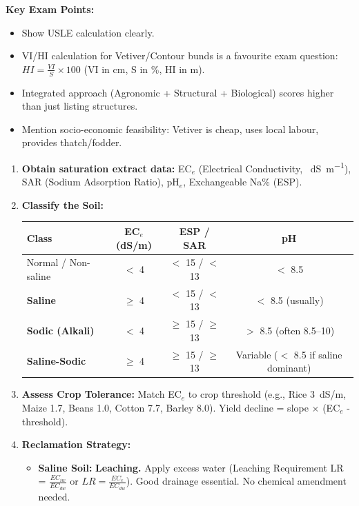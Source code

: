 \documentclass[11pt]{article}
\begin{document}
\begin{exoresolu}
\noindent\textbf{Key Exam Points:} 
\begin{itemize}
\item Show USLE calculation clearly.
\item VI/HI calculation for Vetiver/Contour bunds is a favourite exam question: $HI = \frac{VI}{S} \times 100$ (VI in cm, S in \%, HI in m).
\item Integrated approach (Agronomic + Structural + Biological) scores higher than just listing structures.
\item Mention socio-economic feasibility: Vetiver is cheap, uses local labour, provides thatch/fodder.
\end{itemize}
\end{exoresolu}

\begin{methode}
\begin{enumerate}
\item \textbf{Obtain saturation extract data:} EC$_e$ (Electrical Conductivity, \SI{}{dS.m^{-1}}), SAR (Sodium Adsorption Ratio), pH$_e$, Exchangeable Na\% (ESP).
\item \textbf{Classify the Soil:}
      \begin{center}
      \begin{tabular}{|l|c|c|c|}\hline
      \rowcolor{popblueL}
      \textbf{Class} & \textbf{EC$_e$ (dS/m)} & \textbf{ESP / SAR} & \textbf{pH} \\\hline
      Normal / Non-saline & $<$ 4 & $<$ 15 / $<$ 13 & $<$ 8.5 \\\hline
      \textbf{Saline} & $\ge$ 4 & $<$ 15 / $<$ 13 & $<$ 8.5 (usually) \\\hline
      \textbf{Sodic (Alkali)} & $<$ 4 & $\ge$ 15 / $\ge$ 13 & $>$ 8.5 (often 8.5--10) \\\hline
      \textbf{Saline-Sodic} & $\ge$ 4 & $\ge$ 15 / $\ge$ 13 & Variable ($<$ 8.5 if saline dominant) \\\hline
      \end{tabular}
      \end{center}
\item \textbf{Assess Crop Tolerance:} Match EC$_e$ to crop threshold (e.g., Rice \SI{3}{dS/m}, Maize \num{1.7}, Beans \num{1.0}, Cotton \num{7.7}, Barley \num{8.0}). Yield decline = slope $\times$ (EC$_e$ - threshold).
\item \textbf{Reclamation Strategy:}
      \begin{itemize}
      \item \textbf{Saline Soil:} \textbf{Leaching.} Apply excess water (Leaching Requirement LR = $\frac{EC_{iw}}{EC_{dw}}$ or $LR = \frac{EC_e}{EC_{dw}}$). Good drainage essential. No chemical amendment needed.

\end{itemize}
\end{enumerate}
\end{methode}
\end{document}
